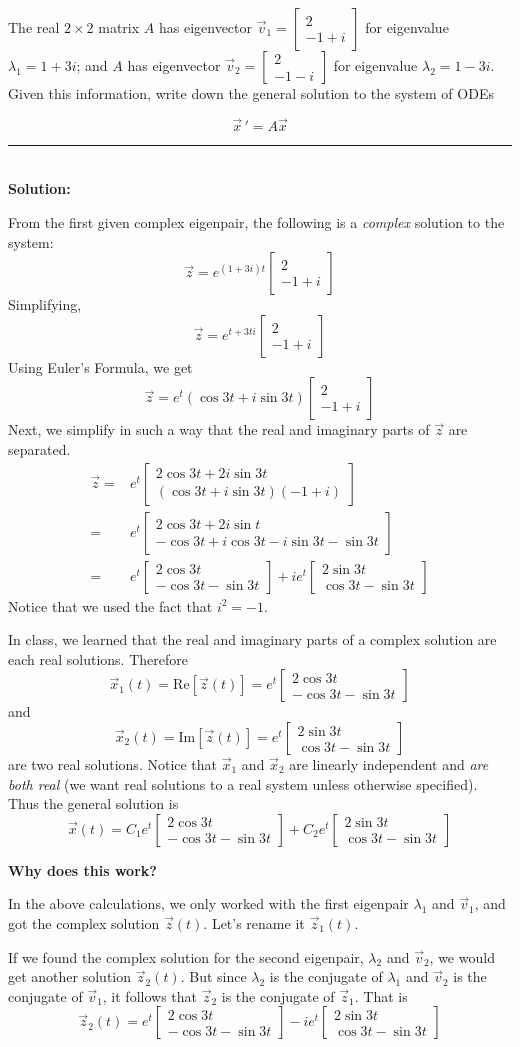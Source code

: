 \documentclass[addpoints,12pt]{exam}
\newcommand{\vv}[2]{\begin{bmatrix} #1 \\ #2 \end{bmatrix}}
\begin{document}
\begin{questions}
 
 \question[3] The real $2\times2$ matrix $A$  has eigenvector $\vec v_1=\vv{2}{-1+i}$ for eigenvalue $\lambda_1=1+3i$; and $A$ has eigenvector  $\vec v_2=\vv{2}{-1-i}$ for eigenvalue $\lambda_2=1-3i$. Given this information, write down the general solution to the system of ODEs
 
 $$\vec x\,'=A\vec x$$
 
\hrule
~\\

\textbf{Solution:}

From the first given complex eigenpair, the following is a \emph{complex} solution to the system:
$$\vec z=e^{(1+3i)t}\vv{2}{-1+i}$$
 Simplifying,
 $$\vec z=e^{t+3ti}\vv{2}{-1+i}$$
 Using Euler's Formula, we get
 $$\vec z=e^t(\cos 3t+i\sin3t)\vv{2}{-1+i}$$
 Next, we simplify in such a way that the real and imaginary parts of $\vec z$ are separated.
 \begin{align*}
 \vec z=&e^t\vv{2\cos3t+2i\sin 3t}{(\cos 3t+i\sin3t)(-1+i)}\\
 =&e^t\vv{2\cos3t+2i\sin t}{-\cos3t+i\cos3t-i\sin3t-\sin3t}\\
 =&e^t\vv{2\cos3t}{-\cos3t-\sin3t}+ie^t\vv{2\sin3t}{\cos3t-\sin3t}
 \end{align*}
 Notice that we used the fact that $i^2=-1$.
 
 In class, we learned that the real and imaginary parts of a complex solution are each real solutions. Therefore
 $$\vec x_1(t)=\mathrm{Re}[\vec z(t)]=e^t\vv{2\cos3t}{-\cos3t-\sin3t}$$
 and 
 $$\vec x_2(t)=\mathrm{Im}[\vec z(t)]=e^t\vv{2\sin3t}{\cos3t-\sin3t}$$
 are two real solutions. Notice that $\vec x_1$ and $\vec x_2$ are linearly independent and \emph{are both real} (we want real solutions to a real system unless otherwise specified). Thus the general solution is
 $$\vec x(t)=C_1e^t\vv{2\cos3t}{-\cos3t-\sin3t}+C_2e^t\vv{2\sin3t}{\cos3t-\sin3t}$$
 
 \textbf{Why does this work?}
 
 In the above calculations, we only worked with the first eigenpair $\lambda_1$ and $\vec v_1$, and got the complex solution $\vec z(t)$. Let's rename it $\vec z_1(t)$.
 
 If we found the complex solution for the second eigenpair, $\lambda_2$ and $\vec v_2$, we would get another solution $\vec z_2(t)$. But since $\lambda_2$ is the conjugate of $\lambda_1$ and $\vec v_2$ is the conjugate of $\vec v_1$, it follows that $\vec z_2$ is the conjugate of $\vec z_1$. That is
 $$\vec z_2(t)=e^t\vv{2\cos3t}{-\cos3t-\sin3t}-ie^t\vv{2\sin3t}{\cos3t-\sin3t}$$
 

\end{questions}
\end{document}
